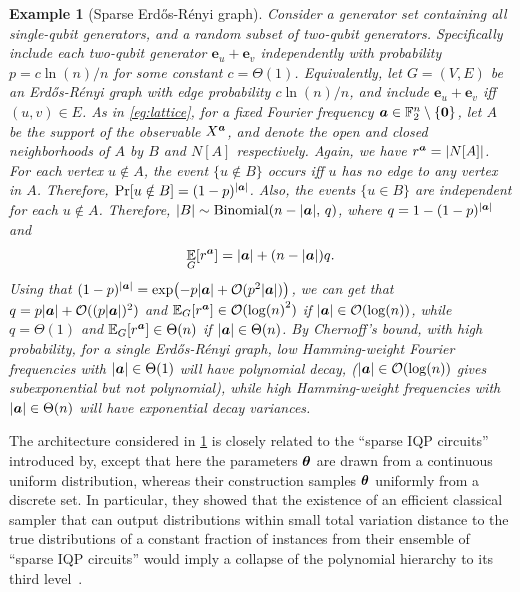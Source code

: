 \documentclass{article}
\theoremstyle{plain}
\newtheorem{example}[theorem]{Example}
\theoremstyle{definition}
\theoremstyle{remark}
\begin{document}
\begin{example}[Sparse Erd\H os-R\'enyi graph]
\label{eg:sparse}
Consider a generator set containing all single-qubit generators, and a random subset of two-qubit generators. Specifically include each two-qubit generator $\bm{e}_u+\bm{e}_v$ independently with probability $p=c \ln(n)/n$ for some constant $c=\Theta(1)$. Equivalently, let $G=(V,E)$ be an Erd\H os-R\'enyi graph with edge probability $c \ln(n)/n$, and include $\bm{e}_u+\bm{e}_v$ iff $(u,v)\in E$. As in \cref{eg:lattice}, for a fixed Fourier frequency ${\bm{a}} \in \mathbb{F}_2^n \setminus \{\bm{0}\}$, let $A$ be the support of the observable $X^{\bm{a}}$, and denote the open and closed neighborhoods of $A$ by $B$ and $N[A]$ respectively. Again, we have $r^{\bm{a}} = \abs{N[A]}$. For each vertex $u\notin A$, the event $\{u\notin B\}$ occurs iff $u$ has no edge to any vertex in $A$. Therefore, $\Pr[u\notin B] = (1-p)^{\abs{{\bm{a}}}}$.
Also, the events $\{u\in B\}$ are independent for each $u \notin A$.
Therefore, $\abs{B} \sim \mathrm{Binomial}(n-\abs{{\bm{a}}},\,q)$, 
where $q = 1-(1-p)^{\abs{{\bm{a}}}}$ and \begin{equation}\operatorname*{\mathbb{E}}_G[r^{\bm{a}}] = \abs{{\bm{a}}} + (n-\abs{{\bm{a}}})q. \label{eq:sparse ra}
\end{equation}
Using that $(1-p)^\abs{{\bm{a}}} = \exp(-p\abs{{\bm{a}}} + \mathcal{O}(p^2\abs{{\bm{a}}}))$, we can get that $q=p\abs{{\bm{a}}} + \mathcal{O}((p\abs{{\bm{a}}})^2)$ and $\operatorname*{\mathbb{E}}_G[r^{\bm{a}}] \in \mathcal{O}(\log(n)^2)$ if $\abs{{\bm{a}}} \in \mathcal{O}(\log(n))$, while $q = \Theta(1)$ and $\operatorname*{\mathbb{E}}_G[r^{\bm{a}}] \in \Theta(n)$ if $\abs{{\bm{a}}} \in \Theta(n)$. By Chernoff's bound, with high probability, for a single Erd\H os-R\'enyi graph, low Hamming-weight Fourier frequencies with $\abs{{\bm{a}}} \in \Theta(1)$ will have polynomial decay, ($\abs{{\bm{a}}} \in \mathcal{O}(\log(n))$ gives subexponential but not polynomial), while high Hamming-weight frequencies with $\abs{{\bm{a}}} \in \Theta(n)$ will have exponential decay variances.
\end{example}

The architecture considered in \cref{eg:sparse} is closely related to the ``sparse IQP circuits'' introduced by\citet{Bremner17}, except that here the parameters ${\bm{\theta}}$ are drawn from a continuous uniform distribution, whereas their construction samples ${\bm{\theta}}$ uniformly from a discrete set. In particular, they showed that the existence of an efficient classical sampler that can output distributions within small total variation distance to the true distributions of a constant fraction of instances from their ensemble of ``sparse IQP circuits'' would imply a collapse of the polynomial hierarchy to its third level~\citep{Bremner17}.
\end{document}
